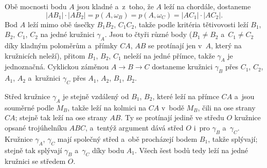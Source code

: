 {    Obě mocnosti bodu $A$ jsou kladné a~z~toho, že $A$ leží na chordále, dostaneme
    $$
    |AB_1| \cdot |AB_2| = p(A,\omega_B) = p(A,\omega_C) = |AC_1| \cdot |AC_2|.
    $$
    Bod $A$ leží mimo obě úsečky $B_1B_2$, $C_1C_2$, takže podle kritéria tětivovosti leží $B_1$, $B_2$, $C_1$, $C_2$ na jedné kružnici $\gamma_A$. Jsou to čtyři různé body ($B_1 \neq B_2$ a~$C_1 \neq C_2$ díky kladným poloměrům a~přímky $CA$, $AB$ se protínají jen v~$A$, který na kružnicích neleží), přitom $B_1$, $B_2$, $C_1$ neleží na jedné přímce, takže $\gamma_A$ je jednoznačná. Cyklickou záměnou $A \to B \to C$ dostaneme kružnici $\gamma_B$ přes $C_1$, $C_2$, $A_1$, $A_2$ a~kružnici $\gamma_C$ přes $A_1$, $A_2$, $B_1$, $B_2$.

    Střed kružnice $\gamma_A$ je stejně vzdálený od $B_1$, $B_2$, které leží na přímce $CA$ a~jsou souměrné podle $M_B$, takže leží na kolmici na $CA$ v~bodě $M_B$, čili na ose strany $CA$; stejně tak leží na ose strany $AB$. Ty se protínají jedině ve středu $O$ kružnice opsané trojúhelníku $ABC$, a~tentýž argument dává střed $O$ i~pro $\gamma_B$ a~$\gamma_C$. Kružnice $\gamma_A$, $\gamma_C$ mají společný střed a~obě procházejí bodem $B_1$, takže splývají; stejně tak splývají $\gamma_B$ a~$\gamma_C$ díky bodu $A_1$. Všech šest bodů tedy leží na jedné kružnici se středem $O$.
}

